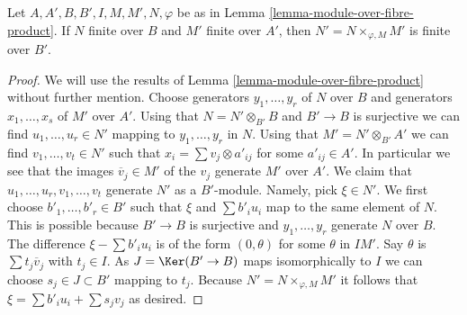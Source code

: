 \begin{lemma}
\label{lemma-finite-module-over-fibre-product}
Let $A, A', B, B', I, M, M', N, \varphi$ be as in
Lemma \ref{lemma-module-over-fibre-product}.
If $N$ finite over $B$ and $M'$ finite over $A'$, then
$N' = N \times_{\varphi, M} M'$ is finite over $B'$.
\end{lemma}

\begin{proof}
We will use the results of
Lemma \ref{lemma-module-over-fibre-product}
without further mention. Choose generators $y_1, \ldots, y_r$ of $N$ over $B$
and generators $x_1, \ldots, x_s$ of $M'$ over $A'$. Using that
$N = N' \otimes_{B'} B$ and $B' \to B$ is surjective we can find
$u_1, \ldots, u_r \in N'$ mapping to $y_1, \ldots, y_r$ in $N$.
Using that $M' = N' \otimes_{B'} A'$ we can find $v_1, \ldots, v_t \in N'$
such that $x_i = \sum v_j \otimes a'_{ij}$ for some $a'_{ij} \in A'$.
In particular we see that the images $\overline{v}_j \in M'$
of the $v_j$ generate $M'$ over $A'$.
We claim that $u_1, \ldots, u_r, v_1, \ldots, v_t$
generate $N'$ as a $B'$-module. Namely, pick $\xi \in N'$. We first choose
$b'_1, \ldots, b'_r \in B'$ such that $\xi$ and $\sum b'_i u_i$ map
to the same element of $N$. This is possible because $B' \to B$
is surjective and $y_1, \ldots, y_r$ generate $N$ over $B$.
The difference $\xi - \sum b'_i u_i$ is of the form $(0, \theta)$
for some $\theta$ in $IM'$. Say $\theta$ is $\sum t_j\overline{v}_j$
with $t_j \in I$. As $J = \Ker(B' \to B)$ maps isomorphically to $I$
we can choose $s_j \in J \subset B'$ mapping to $t_j$.
Because $N' = N \times_{\varphi, M} M'$ it follows
that $\xi = \sum b'_i u_i + \sum s_j v_j$ as desired.
\end{proof}
